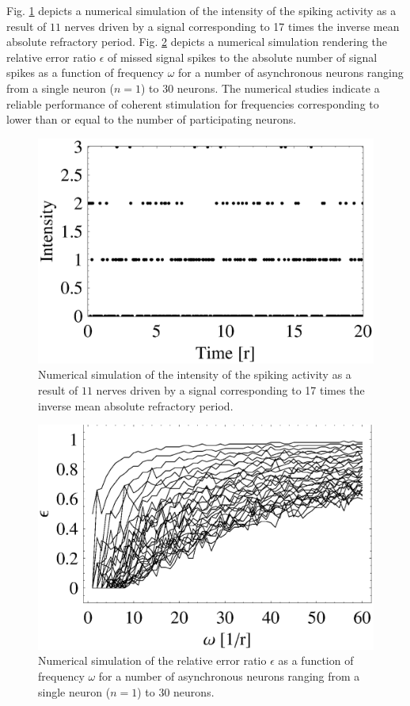 \documentclass[prl,preprint,amsfonts,showpacs,showkeys]{revtex4}
\begin{document}
Fig. \ref{2006-highpitch-f2} depicts a numerical simulation
of the intensity of the spiking activity as a result of $11$ nerves driven by a signal
corresponding to 17 times the inverse mean absolute refractory period.
Fig. \ref{2006-highpitch-f3} depicts a numerical simulation
rendering the relative error ratio $\epsilon$ of missed signal spikes to the absolute number of signal spikes
as a function of frequency
$\omega$
for a number of asynchronous neurons ranging from a single neuron ($n=1$) to 30 neurons.
The numerical studies indicate a reliable performance of coherent stimulation for
frequencies corresponding to lower than or equal to the number of participating neurons.


\begin{figure}
  \centering
  \includegraphics[width=150mm]{2006-highpitch-f1}
  \caption{Numerical simulation of the intensity of the spiking activity as a result of $11$ nerves driven by a signal
corresponding to 17 times the inverse mean absolute refractory period.
}
\label{2006-highpitch-f2}
\end{figure}

\begin{figure}
  \centering
  \includegraphics[width=150mm]{2006-highpitch-f2}
  \caption{Numerical simulation of the relative error ratio $\epsilon$ as a function of frequency
$\omega$
for a number of asynchronous neurons ranging from a single neuron ($n=1$) to 30 neurons.
}
\label{2006-highpitch-f3}
\end{figure}
\end{document}
